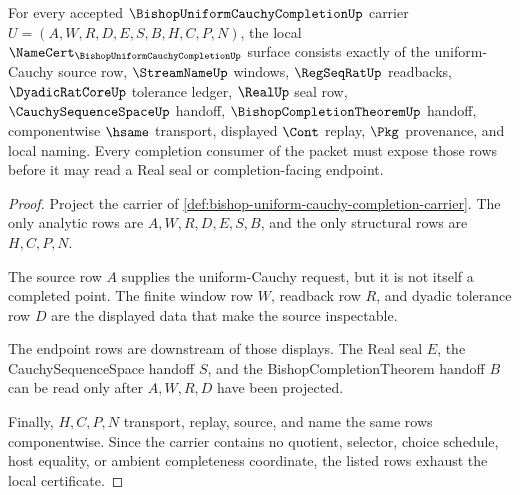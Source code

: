 \begin{theorem}
\label{thm:bishop-uniform-cauchy-completion-namecert-obligations}
For every accepted $\BishopUniformCauchyCompletionUp$ carrier $U=(A,W,R,D,E,S,B,H,C,P,N)$, the local $\NameCert_{\BishopUniformCauchyCompletionUp}$ surface consists exactly of the uniform-Cauchy source row, $\StreamNameUp$ windows, $\RegSeqRatUp$ readbacks, $\DyadicRatCoreUp$ tolerance ledger, $\RealUp$ seal row, $\CauchySequenceSpaceUp$ handoff, $\BishopCompletionTheoremUp$ handoff, componentwise $\hsame$ transport, displayed $\Cont$ replay, $\Pkg$ provenance, and local naming. Every completion consumer of the packet must expose those rows before it may read a Real seal or completion-facing endpoint.
\end{theorem}
\begin{proof}
Project the carrier of \autoref{def:bishop-uniform-cauchy-completion-carrier}. The only analytic rows are $A,W,R,D,E,S,B$, and the only structural rows are $H,C,P,N$.

The source row $A$ supplies the uniform-Cauchy request, but it is not itself a completed point. The finite window row $W$, readback row $R$, and dyadic tolerance row $D$ are the displayed data that make the source inspectable.

The endpoint rows are downstream of those displays. The Real seal $E$, the CauchySequenceSpace handoff $S$, and the BishopCompletionTheorem handoff $B$ can be read only after $A,W,R,D$ have been projected.

Finally, $H,C,P,N$ transport, replay, source, and name the same rows componentwise. Since the carrier contains no quotient, selector, choice schedule, host equality, or ambient completeness coordinate, the listed rows exhaust the local certificate.
\end{proof}

